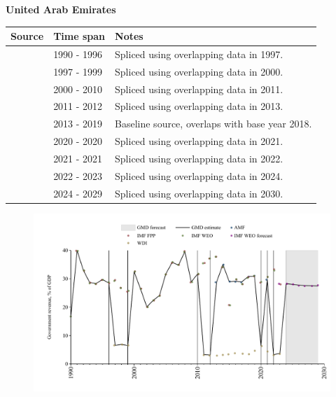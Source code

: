 \documentclass[12pt,a4paper,landscape]{article}
\begin{document}
\begin{adjustbox}{max totalsize={\paperwidth}{\paperheight},center}
\begin{minipage}[t][\textheight][t]{\textwidth}
\vspace*{0.5cm}
{}
\begin{center}
{\Large\bfseries United Arab Emirates}
\end{center}
\vspace{0.5cm}
\begin{table}[H]
\centering
\small
\begin{tabular}{|l|l|l|}
\hline
\textbf{Source} & \textbf{Time span} & \textbf{Notes} \\
\hline
\rowcolor{white}\cite{IMF_WEO}& 1990 - 1996 &Spliced using overlapping data in 1997.\\
\rowcolor{lightgray}\cite{WDI}& 1997 - 1999 &Spliced using overlapping data in 2000.\\
\rowcolor{white}\cite{IMF_WEO}& 2000 - 2010 &Spliced using overlapping data in 2011.\\
\rowcolor{lightgray}\cite{WDI}& 2011 - 2012 &Spliced using overlapping data in 2013.\\
\rowcolor{white}\cite{AMF}& 2013 - 2019 &Baseline source, overlaps with base year 2018.\\
\rowcolor{lightgray}\cite{WDI}& 2020 - 2020 &Spliced using overlapping data in 2021.\\
\rowcolor{white}\cite{AMF}& 2021 - 2021 &Spliced using overlapping data in 2022.\\
\rowcolor{lightgray}\cite{WDI}& 2022 - 2023 &Spliced using overlapping data in 2024.\\
\rowcolor{white}\cite{IMF_WEO_forecast}& 2024 - 2029 &Spliced using overlapping data in 2030.\\
\hline
\end{tabular}
\end{table}
\begin{figure}[H]
\centering
\includegraphics[width=\textwidth,height=0.6\textheight,keepaspectratio]{graphs/ARE_govrev_GDP.pdf}
\end{figure}
\end{minipage}
\end{adjustbox}
\end{document}
